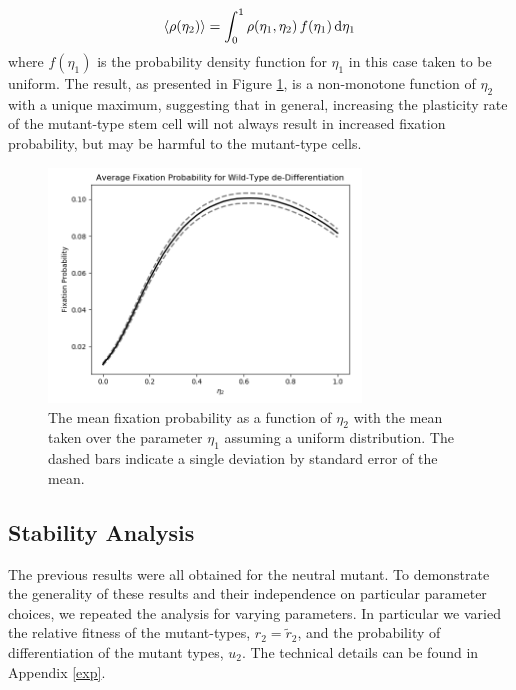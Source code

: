 \documentclass[12pt]{article}
\renewcommand{\d}{{\rm d}}
\begin{document}
\[\langle\rho(\eta_2)\rangle = \int_0^1 \rho(\eta_1, \eta_2)\,f(\eta_1)\,\d \eta_1\]
where $f(\eta_1)$ is the probability density function for $\eta_1$ in this case taken to be uniform. The result, as presented in Figure \ref{avg_eta1_plot}, is a non-monotone function of $\eta_2$ with a unique maximum, suggesting that in general, increasing the plasticity rate of the mutant-type stem cell will not always result in increased fixation probability, but may be harmful to the mutant-type cells.

\begin{figure}[H]
\begin{center}
\includegraphics[width=0.74\textwidth]{avg_eta1_plot.png}
\end{center}
\caption{The mean fixation probability as a function of $\eta_2$ with the mean taken over the parameter $\eta_1$ assuming a uniform distribution. The dashed bars indicate a single deviation by standard error of the mean.}\label{avg_eta1_plot}
\end{figure}

\subsection{Stability Analysis}\label{stab}

The previous results were all obtained for the neutral mutant. To demonstrate the generality of these results and their independence on particular parameter choices, we repeated the analysis for varying parameters. In particular we varied the relative fitness of the mutant-types, $r_2=\tilde{r}_2$, and the probability of differentiation of the mutant types, $u_2$. The technical details can be found in Appendix \ref{exp}.
\end{document}
